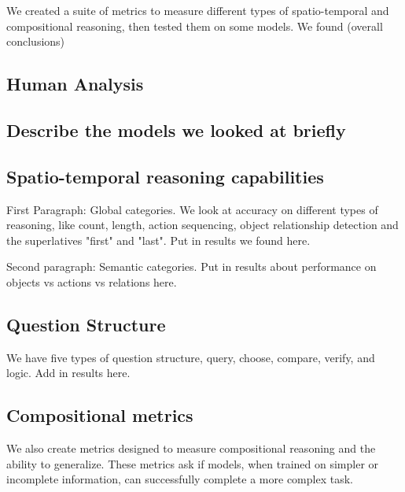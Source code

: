 \documentclass[10pt,twocolumn,letterpaper]{article}
\newcommand{\mgm}[1]{{\color{cyan}{mgm: #1}}}
\begin{document}
We created a suite of metrics to measure different types of spatio-temporal and compositional reasoning, then tested them on some models. We found (overall conclusions)


\subsection{Human Analysis}

\mgm{Include this if it's interesting, otherwise, put results in the in the table}

\subsection{Describe the models we looked at briefly}

\mgm{Is it necessary to do this? CLEVR did, GQA did not}

\subsection{Spatio-temporal reasoning capabilities}
\mgm{May need to bring some of these different reasoning types up earlier, but I'm not sure where. Potentially in the templates section, but that is different from methods}

First Paragraph: Global categories. We look at accuracy on different types of reasoning, like count, length, action sequencing, object relationship detection and the superlatives "first" and "last". Put in results we found here. 

Second paragraph: Semantic categories. Put in results about performance on objects vs actions vs relations here. 

\subsection{Question Structure}

We have five types of question structure, query, choose, compare, verify, and logic. Add in results here. 


\subsection{Compositional metrics}

We also create metrics designed to measure compositional reasoning and the ability to generalize. These metrics ask if models, when trained on simpler or incomplete information, can successfully complete a more complex task.
\end{document}
